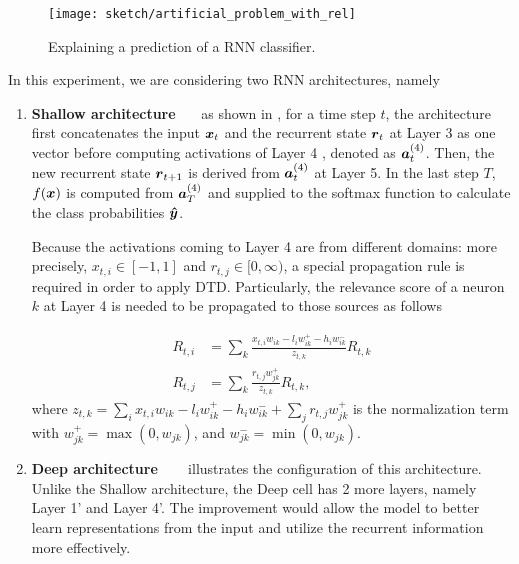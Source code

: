  \begin{figure}[!hbt]
		\centering
		\texttt{[image: sketch/artificial\_problem\_with\_rel]}
		\caption{Explaining a prediction of a RNN classifier.} 
		\label{fig:artificial_problem}
\end{figure}


\begin{figure}[!htb]
\centering

     \hfill
{}
\end{figure}

In this experiment, we are considering two RNN architectures, namely

\begin{enumerate}
	\item \textbf{Shallow architecture}  \ \ \ as shown in \addfigure{\ref{fig:shallow_arch}}, for a time step $t$, the  architecture first concatenates the input $\patvector{x}_t$  and the recurrent state $\patvector{r}_t$ at Layer 3 as one vector before computing activations of Layer 4 , denoted as $\patvector{a}_t^{(4)}$. Then,  the new recurrent state $\patvector{r}_{t+1}$  is derived from $\patvector{a}_t^{(4)}$ at Layer 5. In the last step $T$, $f(\boldsymbol{x})$ is computed from $\patvector{a}^{(4)}_{T}$ and supplied to the softmax function to calculate the class probabilities $\patvector{\hat{y}}$. 
		
Because the activations coming to  Layer 4 are from different domains: more precisely, $x_{t,i} \in [-1, 1]$ and $r_{t,j} \in [0, \infty) $, a special propagation rule is required in order to apply DTD. Particularly, the relevance score of a neuron $k$ at Layer 4 is needed to be propagated to those sources as follows
		
\begin{align*}
	R_{t, i} &= \sum_k \frac{x_{t, i} w_{ik} - l_i w_{ik}^+ - h_i w_{ik}^-}{z_{t,k}}  R_{t,k} \\	
     R_{t, j} &= \sum_k \frac{r_{t, j} w_{jk}^+}{z_{t,k}}  R_{t,k},
\end{align*}
where $z_{t,k} =  \sum_i x_{t,i} w_{ik} - l_i w_{ik}^+ - h_i w_{ik}^- + \sum_j r_{t,j} w_{jk}^+ $ is the normalization term with $w_{jk}^+ = \max(0, w_{jk})$, and $w_{jk}^- = \min(0, w_{jk})$.

	\item \textbf{Deep architecture} \ \ \ \addfigure{\ref{fig:deep_arch}} illustrates the configuration of this architecture. Unlike the Shallow architecture, the Deep cell has 2 more layers, namely Layer 1' and Layer 4'.  The improvement would allow the model to better learn representations from the input and utilize the recurrent information more effectively.
\end{enumerate}

